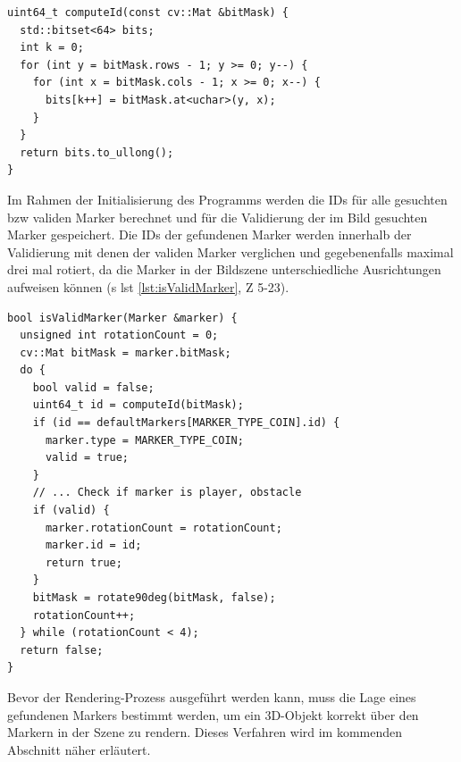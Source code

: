 \newpage

\begin{lstlisting}[caption={Die Funktion \texttt{detectormarkerbased.cpp/computeId();} konvertiert aus einer gegebenen binären Maske eine eindeutige ID}, label={lst:computeId}]
uint64_t computeId(const cv::Mat &bitMask) {
  std::bitset<64> bits;
  int k = 0;
  for (int y = bitMask.rows - 1; y >= 0; y--) {
    for (int x = bitMask.cols - 1; x >= 0; x--) {
      bits[k++] = bitMask.at<uchar>(y, x);
    }
  }
  return bits.to_ullong();
}
\end{lstlisting}

\noindent Im Rahmen der Initialisierung des Programms werden die IDs für alle gesuchten \acs{bzw} validen Marker berechnet und für die Validierung der im Bild gesuchten Marker gespeichert. Die IDs der gefundenen Marker werden innerhalb der Validierung mit denen der validen Marker verglichen und gegebenenfalls maximal drei mal rotiert, da die Marker in der Bildszene unterschiedliche Ausrichtungen aufweisen können (\acs{s} \acs{lst} \ref{lst:isValidMarker}, \acs{Z} 5-23).

\begin{lstlisting}[caption={Die Funktion \texttt{detectormarkerbased.cpp/isValidMarker();} überprüft, ob der übergebene Marker gesucht wird \acs{bzw} valide ist}, label={lst:isValidMarker}]
bool isValidMarker(Marker &marker) {
  unsigned int rotationCount = 0;
  cv::Mat bitMask = marker.bitMask;
  do {
    bool valid = false;
    uint64_t id = computeId(bitMask);
    if (id == defaultMarkers[MARKER_TYPE_COIN].id) {
      marker.type = MARKER_TYPE_COIN;
      valid = true;
    }
    // ... Check if marker is player, obstacle
    if (valid) {
      marker.rotationCount = rotationCount;
      marker.id = id;
      return true;
    }
    bitMask = rotate90deg(bitMask, false);
    rotationCount++;
  } while (rotationCount < 4);
  return false;
}
\end{lstlisting}

\noindent Bevor der Rendering-Prozess ausgeführt werden kann, muss die Lage eines gefundenen Markers bestimmt werden, um ein 3D-Objekt korrekt über den Markern in der Szene zu rendern. Dieses Verfahren wird im kommenden Abschnitt näher erläutert.

